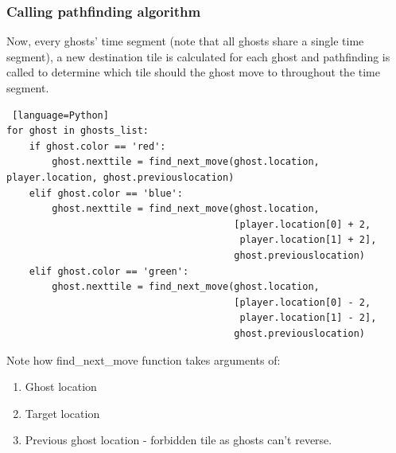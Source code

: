 \documentclass[11pt,a4paper]{report}
\begin{document}
				\subsubsection{Calling pathfinding algorithm}
					Now, every ghosts' time segment (note that all ghosts share a single time segment), a new destination tile is calculated for each ghost and pathfinding is called to determine which tile should the ghost move to throughout the time segment.
					\begin{lstlisting} [language=Python]
for ghost in ghosts_list:
    if ghost.color == 'red':
        ghost.nexttile = find_next_move(ghost.location, player.location, ghost.previouslocation)
    elif ghost.color == 'blue':
        ghost.nexttile = find_next_move(ghost.location,
                                        [player.location[0] + 2,
                                         player.location[1] + 2],
                                        ghost.previouslocation)
    elif ghost.color == 'green':
        ghost.nexttile = find_next_move(ghost.location,
                                        [player.location[0] - 2,
                                         player.location[1] - 2],
                                        ghost.previouslocation)
					\end{lstlisting}
					Note how find\_next\_move function takes arguments of:
					\begin{enumerate}
						\item
							Ghost location
						\item
							Target location
						\item
							Previous ghost location - forbidden tile as ghosts can't reverse.
					\end{enumerate}
\end{document}
